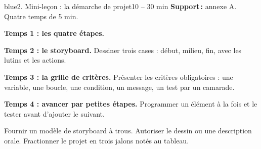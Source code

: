 \documentclass[11pt,a4paper]{article}
\begin{document}
\begin{etape}{blue}{2. Mini-leçon : la démarche de projet}{10 -- 30 min}
\textbf{Support\,:} annexe A. Quatre temps de 5 min.

\textbf{Temps 1 : les quatre étapes.}
\begin{center}
\end{center}

\textbf{Temps 2 : le storyboard.} Dessiner trois cases : début, milieu, fin, avec les lutins et les actions.

\textbf{Temps 3 : la grille de critères.} Présenter les critères obligatoires : une variable, une boucle, une condition, un message, un test par un camarade.

\textbf{Temps 4 : avancer par petites étapes.} Programmer un élément à la fois et le tester avant d'ajouter le suivant.

\begin{astuce}
Fournir un modèle de storyboard à trous. Autoriser le dessin ou une description orale. Fractionner le projet en trois jalons notés au tableau.
\end{astuce}
\end{etape}
\end{document}
